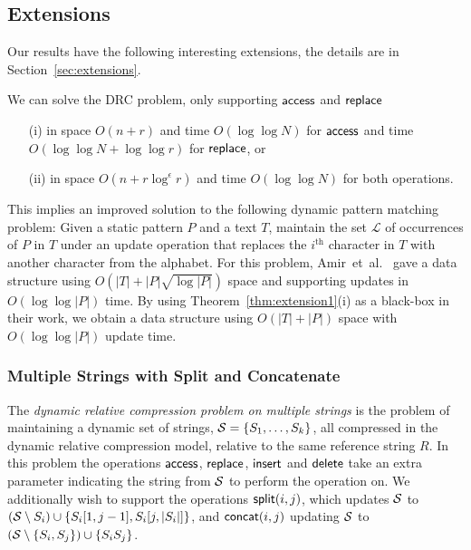 \subsection{Extensions}
Our results have the following interesting extensions, the details are in Section~\ref{sec:extensions}.


\begin{theorem}\label{thm:extension1}
We can solve the DRC problem, only supporting $\mathsf{access}$ and $\mathsf{replace}$
\begin{itemize}
\item[(i)] in space $O(n + r)$ and time $O(\log\log N)$ for $\mathsf{access}$ and time $O(\log\log N + \log\log r)$ for $\mathsf{replace}$, or
\item[(ii)] in space $O(n + r\log^\epsilon r)$ and time $O(\log\log N)$ for both operations.
\end{itemize}
\end{theorem}

\noindent This implies an improved solution to the following dynamic pattern matching problem: Given a static pattern $P$ and a text $T$, maintain the set $\mathcal L$ of occurrences of $P$ in $T$ under an update operation that replaces the $i^\text{th}$ character in $T$ with another character from the alphabet. For this problem, Amir~et~al.~\cite{amir2007dynamic} gave a data structure using $O(|T|+|P|\sqrt{\log |P|})$ space and supporting updates in $O(\log \log |P|)$ time. By using Theorem~\ref{thm:extension1}(i) as a black-box in their work, we obtain a data structure using $O(|T|+|P|)$ space with $O(\log \log |P|)$ update time.

\subsubsection*{Multiple Strings with Split and Concatenate}
The \emph{dynamic relative compression problem on multiple strings} is the problem of maintaining a dynamic set of strings, $\mathcal{S}=\{S_1,\ldots,S_k\}$, all compressed in the dynamic relative compression model, relative to the same reference string $R$. In this problem the operations $\mathsf{access}$, $\mathsf{replace}$, $\mathsf{insert}$ and $\mathsf{delete}$ take an extra parameter indicating the string from $\mathcal{S}$ to perform the operation on. We additionally wish to support the operations $\mathsf{split}(i,j)$, which updates $\mathcal{S}$ to $(\mathcal{S} \setminus S_i) \cup \{S_i[1,j-1], S_i[j,|S_i|]\}$, and $\mathsf{concat}(i,j)$ updating $\mathcal{S}$ to $(\mathcal{S} \setminus \{S_i,S_j\}) \cup \{S_i S_j\}$.

